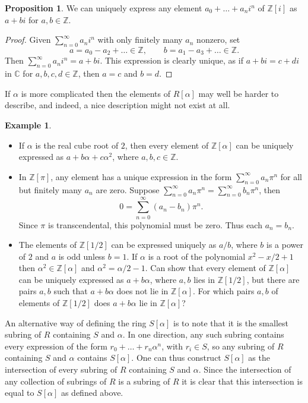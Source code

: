 \documentclass{article}
\newcommand{\Z}{\mathbb{Z}}
\newcommand{\C}{\mathbb{C}}
\newcommand{\rb}[1]{\left( #1 \right)}
\renewcommand{\sb}[1]{\left[ #1 \right]}
\theoremstyle{definition}\newtheorem{definition}{Definition}[subsection]
\theoremstyle{definition}\newtheorem{remark}[definition]{Remark}
\theoremstyle{definition}\newtheorem*{example}{Example}
\theoremstyle{definition}\newtheorem*{note}{Note}
\newtheorem{proposition}[definition]{Proposition}
\begin{document}
\begin{proposition}
We can uniquely express any element $ a_0 + \dots + a_ni^n $ of $ \Z\sb{i} $ as $ a + bi $ for $ a, b \in \Z $.
\end{proposition}

\begin{proof}
Given $ \sum_{n = 0}^\infty a_ni^n $ with only finitely many $ a_n $ nonzero, set
$$ a = a_0 - a_2 + \dots \in \Z, \qquad b = a_1 - a_3 + \dots \in \Z. $$
Then $ \sum_{n = 0}^\infty a_ni^n = a + bi $. This expression is clearly unique, as if $ a + bi = c + di $ in $ \C $ for $ a, b, c, d \in \Z $, then $ a = c $ and $ b = d $.
\end{proof}

If $ \alpha $ is more complicated then the elements of $ R\sb{\alpha} $ may well be harder to describe, and indeed, a nice description might not exist at all.

\begin{example}
\hfill
\begin{itemize}
\item If $ \alpha $ is the real cube root of $ 2 $, then every element of $ \Z\sb{\alpha} $ can be uniquely expressed as $ a + b\alpha + c\alpha^2 $, where $ a, b, c \in \Z $.
\item In $ \Z\sb{\pi} $, any element has a unique expression in the form $ \sum_{n = 0}^\infty a_n\pi^n $ for all but finitely many $ a_n $ are zero. Suppose $ \sum_{n = 0}^\infty a_n\pi^n = \sum_{n = 0}^\infty b_n\pi^n $, then
$$ 0 = \sum_{n = 0}^\infty \rb{a_n - b_n}\pi^n. $$
Since $ \pi $ is transcendental, this polynomial must be zero. Thus each $ a_n = b_n $.
\item The elements of $ \Z\sb{1 / 2} $ can be expressed uniquely as $ a / b $, where $ b $ is a power of $ 2 $ and $ a $ is odd unless $ b = 1 $. If $ \alpha $ is a root of the polynomial $ x^2 - x / 2 + 1 $ then $ \alpha^2 \in \Z\sb{\alpha} $ and $ \alpha^2 = \alpha / 2 - 1 $. Can show that every element of $ \Z\sb{\alpha} $ can be uniquely expressed as $ a + b\alpha $, where $ a, b $ lies in $ \Z\sb{1 / 2} $, but there are pairs $ a, b $ such that $ a + b\alpha $ does not lie in $ \Z\sb{\alpha} $. For which pairs $ a, b $ of elements of $ \Z\sb{1 / 2} $ does $ a + b\alpha $ lie in $ \Z\sb{\alpha} $?
\end{itemize}
\end{example}

An alternative way of defining the ring $ S\sb{\alpha} $ is to note that it is the smallest subring of $ R $ containing $ S $ and $ \alpha $. In one direction, any such subring contains every expression of the form $ r_0 + \dots + r_n\alpha^n $, with $ r_i \in S $, so any subring of $ R $ containing $ S $ and $ \alpha $ contains $ S\sb{\alpha} $. One can thus construct $ S\sb{\alpha} $ as the intersection of every subring of $ R $ containing $ S $ and $ \alpha $. Since the intersection of any collection of subrings of $ R $ is a subring of $ R $ it is clear that this intersection is equal to $ S\sb{\alpha} $ as defined above.
\end{document}

